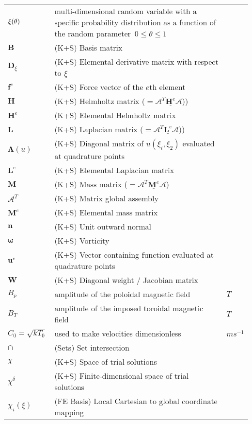 \begin{longtable}{|p{3.0cm}|p{10.0cm}|p{3.0cm}|}
${\boldmath \xi}(\theta)$ & multi-dimensional random variable with a specific probability distribution as a function of the random parameter~$0\leq\theta\leq 1$ & \\
$\boldsymbol{B}$ &  (K+S) Basis matrix & \\
$\boldsymbol{D}_{\xi}$ &  (K+S) Elemental derivative matrix with respect to $\xi$ & \\
$\boldsymbol{f}^e$ &  (K+S) Force vector of the $e$th element & \\
$\boldsymbol{H}$ &  (K+S) Helmholtz matrix ($=\mathcal{A}^T \underline{\boldsymbol{H}^e} \mathcal{A}$)) & \\
$\boldsymbol{H}^e$ &  (K+S) Elemental Helmholtz matrix & \\
$\boldsymbol{L}$ &  (K+S) Laplacian matrix ($=\mathcal{A}^T \underline{\boldsymbol{L}^e} \mathcal{A}$)) & \\
$\boldsymbol{\Lambda}(u)$ &  (K+S) Diagonal matrix of $u(\xi_i, \xi_2)$ evaluated at quadrature points & \\
$\boldsymbol{L}^e$ &  (K+S) Elemental Laplacian matrix & \\
$\boldsymbol{M}$ &  (K+S) Mass matrix ($=\mathcal{A}^T \underline{\boldsymbol{M}^e} \mathcal{A}$) & \\
$\boldsymbol{\mathcal{A}}^T$ &  (K+S) Matrix global assembly & \\
$\boldsymbol{M}^e$ &  (K+S) Elemental mass matrix & \\
$\boldsymbol{n}$ &  (K+S) Unit outward normal & \\
$\boldsymbol{\omega}$ &  (K+S) Vorticity & \\
$\boldsymbol{u}^e$ &  (K+S) Vector containing function evaluated at quadrature points & \\
$\boldsymbol{W}$ &  (K+S) Diagonal weight / Jacobian matrix & \\
$B_p$ & amplitude of the poloidal magnetic field  &  $T$  \\
$B_T$ & amplitude of the imposed toroidal magnetic field  &  $T$  \\
$C_0=\sqrt{kT_0}$ & used to make velocities dimensionless  &  $m s^{-1}$ \\
$\cap$ &  (Sets) Set intersection & \\
$\chi$ &  (K+S) Space of trial solutions & \\
$\chi^{\delta}$ &  (K+S) Finite-dimensional space of trial solutions & \\
$\chi_i(\xi)$ &  (FE Basis) Local Cartesian to global coordinate mapping & \\

\end{longtable}
